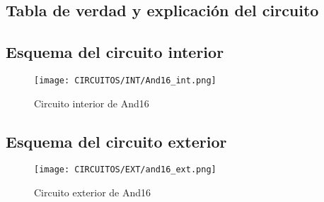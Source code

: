 \documentclass[12pt]{article}
\begin{document}
    \subsection{Tabla de verdad y explicación del circuito}
        \begin{table}[H]
        \centering
        \caption{Tabla de verdad de AND16}
        \label{tab:tab_and16}
        \end{table}

    \subsection{Esquema del circuito interior}
        \begin{figure}[H]
            \centering
            \texttt{[image: CIRCUITOS/INT/And16\_int.png]}
            \caption{Circuito interior de And16 \cite{circuitverse}}
            \label{fig:and16_int}
        \end{figure}
    \subsection{Esquema del circuito exterior}
        \begin{figure}[H]
            \centering
            \texttt{[image: CIRCUITOS/EXT/and16\_ext.png]}
            \caption{Circuito exterior de And16 \cite{circuitverse}}
            \label{fig:and16_ext}
        \end{figure}
\end{document}
